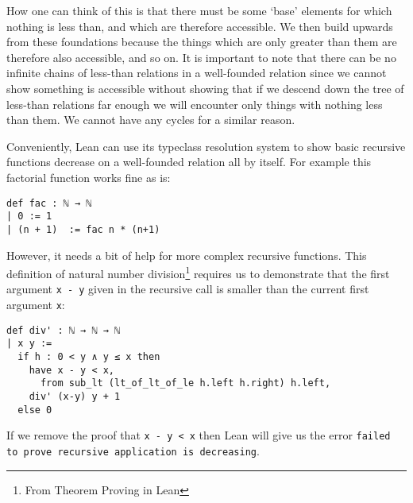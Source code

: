 \documentclass{article}
\newcommand{\ct}{\texttt}
\begin{document}
How one can think of this is that there must be some `base' elements for which nothing is less than, and which are therefore accessible.
We then build upwards from these foundations because the things which are only greater than them are therefore also accessible, and so on.
It is important to note that there can be no infinite chains of less-than relations in a well-founded relation since we cannot show something is accessible without showing that if we descend down the tree of less-than relations far enough we will encounter only things with nothing less than them. %
We cannot have any cycles for a similar reason.

Conveniently, Lean can use its typeclass resolution system to show basic recursive functions decrease on a well-founded relation all by itself. For example this factorial function works fine as is:
\begin{lstlisting}
def fac : ℕ → ℕ
| 0 := 1
| (n + 1)  := fac n * (n+1)
\end{lstlisting}
However, it needs a bit of help for more complex recursive functions.
This definition of natural number division\footnote{From Theorem Proving in Lean} requires us to demonstrate that the first argument \ct{x - y} given in the recursive call is smaller than the current first argument \ct{x}:
\begin{lstlisting}
def div' : ℕ → ℕ → ℕ
| x y :=
  if h : 0 < y ∧ y ≤ x then
    have x - y < x,
      from sub_lt (lt_of_lt_of_le h.left h.right) h.left,
    div' (x-y) y + 1
  else 0
\end{lstlisting}
If we remove the proof that \ct{x - y < x} then Lean will give us the error \ct{failed to prove recursive application is decreasing}.
\end{document}
